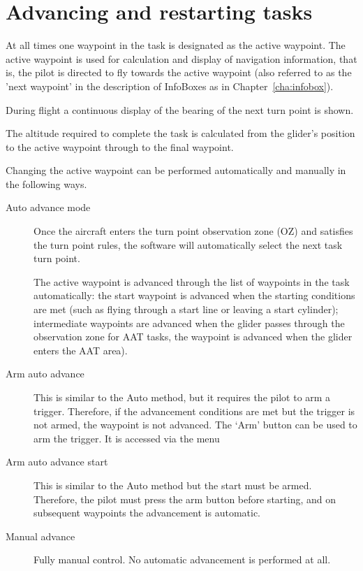 \documentclass[a4paper,12pt]{refrep}
\begin{document}
\section{Advancing and restarting tasks}\label{sec:advanc-rest-tasks}
At all times one waypoint in the task is designated as the active
waypoint.  The active waypoint is used for calculation and display of
navigation information, that is, the pilot is directed to fly towards
the active waypoint (also referred to as the 'next waypoint' in the
description of InfoBoxes as in Chapter~\ref{cha:infobox}).

During flight a continuous display of the bearing of the next turn
point is shown.

The altitude required to complete the task is calculated from the
glider's position to the active waypoint through to the final
waypoint.

Changing the active waypoint can be performed automatically and
manually in the following ways.
\begin{description}
\item[Auto advance mode]
Once the aircraft enters the turn point observation zone (OZ) and satisfies
the turn point rules, the software will automatically select the next
task turn point.

The active waypoint is advanced through the list of waypoints in the
task automatically: the start waypoint is advanced when the starting
conditions are met (such as flying through a start line or leaving a
start cylinder); intermediate waypoints are advanced when the glider
passes through the observation zone for AAT tasks, the waypoint is
advanced when the glider enters the AAT area).
\item[Arm auto advance]
This is similar to the Auto method, but it requires the pilot to arm a
trigger.  Therefore, if the advancement conditions are met but the
trigger is not armed, the waypoint is not advanced.  The `Arm' button can be 
used to arm the trigger.  It is accessed via the menu
\begin{quote}
\blink{}
\end{quote}
\item[Arm auto advance start]
This is similar to the Auto method but the start must be armed.
Therefore, the pilot must press the arm button before starting, and on
subsequent waypoints the advancement is automatic.
\item[Manual advance]
Fully manual control.  No automatic advancement is performed at all.
\end{description}  
\end{document}

